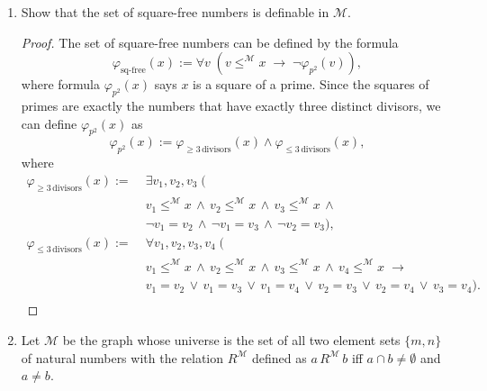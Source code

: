 \documentclass{article}
\begin{document}
\begin{enumerate}
\begin{enumerate}
      \item Show that the set of square-free numbers is definable in
        $\mathcal{M}$.
        \begin{proof}
          The set of square-free numbers can be defined by the formula
          \begin{equation*}
            \varphi_{\text{sq-free}}(x) := \forall v\;
            (v\leq^{\mathcal{M}}x\; \rightarrow\;
            \neg\varphi_{p^2}(v)),
          \end{equation*}
          where formula $\varphi_{p^2}(x)$ says $x$ is a square of a prime.
          Since the squares of primes are exactly the numbers that have
          exactly three distinct divisors, we can define $\varphi_{p^2}(x)$
          as
          \begin{equation*}
            \varphi_{p^2}(x) := \varphi_{\geq 3\,\text{divisors}}(x) \wedge
            \varphi_{\leq 3\,\text{divisors}}(x),
          \end{equation*}
          where
          \begin{align*}
            \varphi_{\geq 3\,\text{divisors}}(x) :=\;
              & \exists v_1,v_2,v_3\; ( \\
              & v_1\leq^{\mathcal{M}}x\,\wedge\,
                v_2\leq^{\mathcal{M}}x\,\wedge\,
                v_3\leq^{\mathcal{M}}x\,\wedge\, \\
              & \neg v_1=v_2\, \wedge\,
                \neg v_1=v_3\, \wedge\,
                \neg v_2=v_3), \\
            \varphi_{\leq 3\,\text{divisors}}(x) :=\;
              & \forall v_1,v_2,v_3,v_4\; ( \\
              & v_1\leq^{\mathcal{M}}x\,\wedge\,
                v_2\leq^{\mathcal{M}}x\,\wedge\,
                v_3\leq^{\mathcal{M}}x\,\wedge\,
                v_4\leq^{\mathcal{M}}x\;\rightarrow\; \\
              & v_1=v_2\, \vee\,
                v_1=v_3\, \vee\,
                v_1=v_4\, \vee\,
                v_2=v_3\, \vee\,
                v_2=v_4\, \vee\,
                v_3=v_4). \\
          \end{align*}
        \end{proof}

      \item Let $\mathcal{M}$ be the graph whose universe is the set of all
        two element sets $\{m,n\}$ of natural numbers with the relation
        $R^{\mathcal{M}}$ defined as $a\,R^{\mathcal{M}}\,b$ iff $a\cap
        b\neq\emptyset$ and $a\neq b$.


\end{enumerate}
\end{enumerate}
\end{document}
